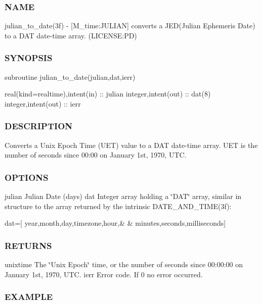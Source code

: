 \subsubsection*{N\+A\+ME}

julian\+\_\+to\+\_\+date(3f) -\/ \mbox{[}M\+\_\+time\+:J\+U\+L\+I\+AN\mbox{]} converts a J\+E\+D(\+Julian Ephemeris Date) to a D\+AT date-\/time array. (L\+I\+C\+E\+N\+SE\+:PD) 

\subsubsection*{S\+Y\+N\+O\+P\+S\+IS}

\begin{DoxyVerb}subroutine julian_to_date(julian,dat,ierr)

 real(kind=realtime),intent(in) :: julian
 integer,intent(out)            :: dat(8)
 integer,intent(out)            :: ierr
\end{DoxyVerb}


\subsubsection*{D\+E\+S\+C\+R\+I\+P\+T\+I\+ON}

Converts a Unix Epoch Time (U\+ET) value to a D\+AT date-\/time array. U\+ET is the number of seconds since 00\+:00 on January 1st, 1970, U\+TC.

\subsubsection*{O\+P\+T\+I\+O\+NS}

julian Julian Date (days) dat Integer array holding a \char`\"{}\+D\+A\+T\char`\"{} array, similar in structure to the array returned by the intrinsic D\+A\+T\+E\+\_\+\+A\+N\+D\+\_\+\+T\+I\+M\+E(3f)\+:

dat=\mbox{[} year,month,day,timezone,hour,\& \& minutes,seconds,milliseconds\mbox{]}

\subsubsection*{R\+E\+T\+U\+R\+NS}

unixtime The \char`\"{}\+Unix Epoch\char`\"{} time, or the number of seconds since 00\+:00\+:00 on January 1st, 1970, U\+TC. ierr Error code. If 0 no error occurred.

\subsubsection*{E\+X\+A\+M\+P\+LE}

